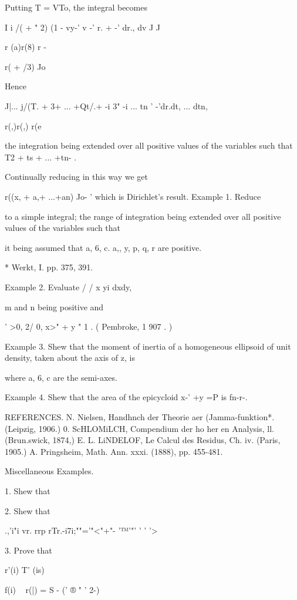 Putting T = VTo, the integral becomes

I i /( + " 2) (1 - vy-' v -' r. + -' dr., dv J J

r (a)r(8) r -

r( + /3) Jo

Hence

  J|... j/(T. + 3+ ... +Qt/.+ -i 3" -i ... tn ' -'dr.dt, ... dtn,

r(,)r(,) r(e

the integration being extended over all positive values of the
variables such that T2 + ts + ... +tn- .

Continually reducing in this way we get

r((x, + a,+ ...+an) Jo- ' which is Dirichlet's result. Example 1.
Reduce

to a simple integral; the range of integration being extended over
all positive values of the variables such that

it being assumed that a, 6, c. a,, y, p, q, r are positive.

* Werkt, I. pp. 375, 391.

%
%

Example 2. Evaluate / / x yi dxdy,

m and n being positive and

' >0, 2/ 0, x>" + y " 1 . ( Pembroke, 1 907 . )

Example 3. Shew that the moment of inertia of a homogeneous ellipsoid
of unit density, taken about the axis of z, is

where a, 6, c are the semi-axes.

Example 4. Shew that the area of the epicycloid x-' +y =P is fn-r-.

REFERENCES. N. Nielsen, Handhnch der Theorie aer (Jamma-funktion*.
(Leipzig, 1906.) 0. ScHLOMiLCH, Compendium der ho her en Analysis, ll.
(Brun.swick, 1874,) E. L. LiNDELOF, Le Calcul des Residus, Ch. iv.
(Paris, 1905.) A. Pringsheim, Math. Ann. xxxi. (1888), pp. 455-481.

Miscellaneous Examples.

1. Shew that


2. Shew that

.,'i"i vr. rrp rTr.-i7i;""='"<"+"- '™'"' ' ' '>

3. Prove that

r'(i) T' (is)

f(i) ~ r(|) = S - (' ® " ' 2-)


